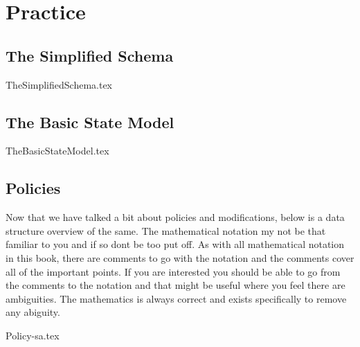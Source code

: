 \chapter{Practice}
\label{intro:03} %


\section{The Simplified Schema}
\label{sec:03:1}
{TheSimplifiedSchema.tex}

\section{The Basic State Model}
\label{sec:03:2}
{TheBasicStateModel.tex}

\section{Policies}
\label{sec:03:3}
Now that we have talked a bit about policies and modifications, below is a data structure overview of the same. The mathematical notation my not be
that familiar to you and if so dont be too put off. As with all mathematical notation in this book, there are comments to go with the notation
and the comments cover all of the important points. If you are interested you should be able to go from the comments to the notation and that
might be useful where you feel there are ambiguities. The mathematics is always correct and exists specifically to remove any abiguity.

{Policy-sa.tex}

